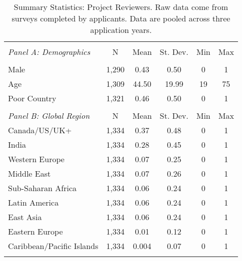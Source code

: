     \newpage
    \begin{table}[!htbp] \centering 
      \caption{Summary Statistics: Project Reviewers. Raw data come from surveys completed by applicants. Data are pooled across three application years.}\label{tab:pooled_rev_demo}
      \label{} 
    \begin{tabular}{@{\extracolsep{5pt}}lccccc} 
    \\[-1.8ex]\hline 
    \hline \\[-1.8ex] 
    \emph{Panel A: Demographics} & \multicolumn{1}{c}{N} & \multicolumn{1}{c}{Mean} & \multicolumn{1}{c}{St. Dev.} & \multicolumn{1}{c}{Min} & \multicolumn{1}{c}{Max} \\ 
    \hline \\[-1.8ex] 
    Male & 1,290 & 0.43 & 0.50 & 0 & 1 \\ 
    Age & 1,309 & 44.50 & 19.99 & 19 & 75 \\ 
    Poor Country & 1,321 & 0.46 & 0.50 & 0 & 1 \\ 
    \hline
    & & & & & \\
    \emph{Panel B: Global Region} & \multicolumn{1}{c}{N} & \multicolumn{1}{c}{Mean} & \multicolumn{1}{c}{St. Dev.} & \multicolumn{1}{c}{Min} & \multicolumn{1}{c}{Max} \\ 
    \hline
    Canada/US/UK+ & 1,334 & 0.37 & 0.48 & 0 & 1 \\ 
    India & 1,334 & 0.28 & 0.45 & 0 & 1 \\ 
    Western Europe & 1,334 & 0.07 & 0.25 & 0 & 1 \\ 
    Middle East & 1,334 & 0.07 & 0.26 & 0 & 1 \\ 
    Sub-Saharan Africa & 1,334 & 0.06 & 0.24 & 0 & 1 \\ 
    Latin America & 1,334 & 0.06 & 0.24 & 0 & 1 \\ 
    East Asia & 1,334 & 0.06 & 0.24 & 0 & 1 \\ 
    Eastern Europe & 1,334 & 0.01 & 0.12 & 0 & 1 \\ 
    Caribbean/Pacific Islands & 1,334 & 0.004 & 0.07 & 0 & 1 \\ 
    \hline \hline \\[-1.8ex] 
    \end{tabular} 
    \end{table} 